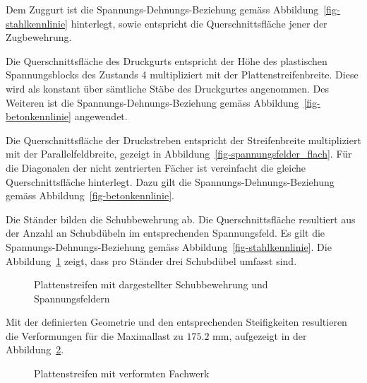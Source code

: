 \documentclass[
  12pt,
  letterpaper,
  egregdoesnotlikesansseriftitles]{scrreprt}
\begin{document}
Dem Zuggurt ist die Spannungs-Dehnungs-Beziehung gemäss
Abbildung~\ref{fig-stahlkennlinie} hinterlegt, sowie entspricht die
Querschnittsfläche jener der Zugbewehrung.

Die Querschnittsfläche des Druckgurts entspricht der Höhe des
plastischen Spannungsblocks des Zustands 4 multipliziert mit der
Plattenstreifenbreite. Diese wird als konstant über sämtliche Stäbe des
Druckgurtes angenommen. Des Weiteren ist die
Spannungs-Dehnungs-Beziehung gemäss Abbildung~\ref{fig-betonkennlinie}
angewendet.

Die Querschnittsfläche der Druckstreben entspricht der Streifenbreite
multipliziert mit der Parallelfeldbreite, gezeigt in
Abbildung~\ref{fig-spannungsfelder_flach}. Für die Diagonalen der nicht
zentrierten Fächer ist vereinfacht die gleiche Querschnittsfläche
hinterlegt. Dazu gilt die Spannungs-Dehnungs-Beziehung gemäss
Abbildung~\ref{fig-betonkennlinie}.

Die Ständer bilden die Schubbewehrung ab. Die Querschnittsfläche
resultiert aus der Anzahl an Schubdübeln im entsprechenden
Spannungsfeld. Es gilt die Spannungs-Dehnungs-Beziehung gemäss
Abbildung~\ref{fig-stahlkennlinie}. Die
Abbildung~\ref{fig-schubbew_fw_flach} zeigt, dass pro Ständer drei
Schubdübel umfasst sind.

\begin{figure}[H]


\caption{\label{fig-schubbew_fw_flach}Plattenstreifen mit dargestellter
Schubbewehrung und Spannungsfeldern}

\end{figure}%

Mit der definierten Geometrie und den entsprechenden Steifigkeiten
resultieren die Verformungen für die Maximallast zu
\(175.2 \text{ mm}\), aufgezeigt in der
Abbildung~\ref{fig-deformation_fw}.

\begin{figure}[H]


\caption{\label{fig-deformation_fw}Plattenstreifen mit verformten
Fachwerk}

\end{figure}%
\end{document}
